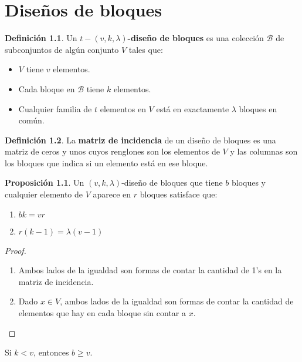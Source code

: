 \documentclass[spanish]{book}
\theoremstyle{definition}
\newtheorem*{defn}{Definición}
\newtheorem*{prop}{Proposición}
\begin{document}
\chapter{Diseños de bloques}
\begin{defn}
	Un $t-(v,k,\lambda)$\textbf{-diseño de bloques} es una colección $\mathcal{B}$ de subconjuntos de algún conjunto $V$ tales que:
	\begin{itemize}
		\item $V$ tiene $v$ elementos.
		\item Cada bloque en $\mathcal{B}$ tiene $k$ elementos.
		\item Cualquier familia de $t$ elementos en $V$ está en exactamente $\lambda$ bloques en común.
	\end{itemize}
\end{defn}
\begin{defn}
	La \textbf{matriz de incidencia} de un diseño de bloques es una matriz de ceros y unos cuyos renglones son los elementos de $V$ y las columnas son los bloques que indica si un elemento está en ese bloque.
\end{defn}
\begin{prop}
	Un $(v,k,\lambda)$-diseño de bloques que tiene $b$ bloques y cualquier elemento de $V$ aparece en $r$ bloques satisface que:
	\begin{enumerate}
		\item $bk=vr$
		\item $r(k-1)=\lambda(v-1)$
	\end{enumerate}
\end{prop}
\begin{proof}\leavevmode
	\begin{enumerate}
		\item Ambos lados de la igualdad son formas de contar la cantidad de 1's en la matriz de incidencia.
		\item Dado $x\in V$, ambos lados de la igualdad son formas de contar la cantidad de elementos que hay en cada bloque sin contar a $x$.
	\end{enumerate}
\end{proof}
\begin{teo}
	Si $k<v$, entonces $b\geq v$.
\end{teo}
\end{document}
